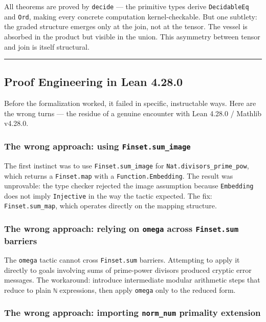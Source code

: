 \documentclass[12pt,a4paper]{article}
\begin{document}
All theorems are proved by \texttt{decide} --- the primitive types derive \texttt{DecidableEq} and \texttt{Ord}, making every concrete computation kernel-checkable. But one subtlety: the graded structure emerges only at the join, not at the tensor. The vessel is absorbed in the product but visible in the union. This asymmetry between tensor and join is itself structural.

\begin{center}
\rule{0.5\textwidth}{0.4pt}
\end{center}

\subsection{Proof Engineering in Lean 4.28.0}

Before the formalization worked, it failed in specific, instructable ways. Here are the wrong turns --- the residue of a genuine encounter with Lean 4.28.0 / Mathlib v4.28.0.

\subsubsection{The wrong approach: using \texttt{Finset.sum\_image}}

The first instinct was to use \texttt{Finset.sum\_image} for \texttt{Nat.divisors\_prime\_pow}, which returns a \texttt{Finset.map} with a \texttt{Function.Embedding}. The result was unprovable: the type checker rejected the image assumption because \texttt{Embedding} does not imply \texttt{Injective} in the way the tactic expected. The fix: \texttt{Finset.sum\_map}, which operates directly on the mapping structure.

\subsubsection{The wrong approach: relying on \texttt{omega} across \texttt{Finset.sum} barriers}

The \texttt{omega} tactic cannot cross \texttt{Finset.sum} barriers. Attempting to apply it directly to goals involving sums of prime-power divisors produced cryptic error messages. The workaround: introduce intermediate modular arithmetic steps that reduce to plain \texttt{ℕ} expressions, then apply \texttt{omega} only to the reduced form.

\subsubsection{The wrong approach: importing \texttt{norm\_num} primality extension}
\end{document}
